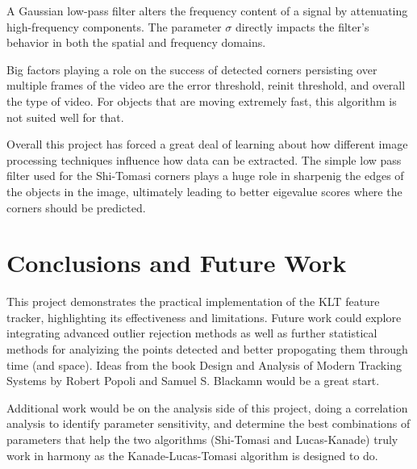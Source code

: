 \documentclass[11pt, conference, letterpaper]{IEEEtran}
\begin{document}
A Gaussian low-pass filter alters the frequency content of a signal by attenuating high-frequency components. The parameter \(\sigma\) directly impacts the filter's behavior in both the spatial and frequency domains.



Big factors playing a role on the success of detected corners persisting over multiple frames of the video are the error threshold, reinit threshold, and overall the type of video. For objects that are moving extremely fast, this algorithm is not suited well for that.

Overall this project has forced a great deal of learning about how different image processing techniques influence how data can be extracted. The simple low pass filter used for the Shi-Tomasi corners plays a huge role in sharpenig the edges of the objects in the image, ultimately leading to better eigevalue scores where the corners should be predicted.

\bigskip

\section{Conclusions and Future Work}
This project demonstrates the practical implementation of the KLT feature tracker, highlighting its effectiveness and limitations. Future work could explore integrating advanced outlier rejection methods as well as further statistical methods for analyizing the points detected and better propogating them through time (and space). Ideas from the book Design and Analysis of Modern Tracking Systems by Robert Popoli and Samuel S. Blackamn would be a great start.

Additional work would be on the analysis side of this project, doing a correlation analysis to identify parameter sensitivity, and determine the best combinations of parameters that help the two algorithms (Shi-Tomasi and Lucas-Kanade) truly work in harmony as the Kanade-Lucas-Tomasi algorithm is designed to do.
\end{document}
